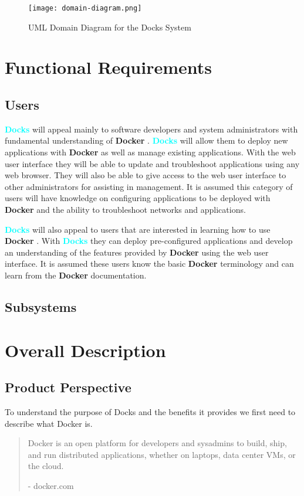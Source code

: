 \documentclass[]{article}
\newcommand{\docks}{\textbf{\textcolor{Cyan}{Docks}} }
\newcommand{\docker}{\textbf{\textcolor{OliveGreen}{Docker}} }
\begin{document}
\begin{figure}[H]
	\centering
	\texttt{[image: domain-diagram.png]}
	\caption{UML Domain Diagram for the Docks System}
\end{figure}

\section{Functional Requirements}

\subsection{Users}
\docks will appeal mainly to software developers and system administrators
with fundamental understanding of \docker. \docks will allow
them to deploy new applications with \docker as well as manage existing 
applications. With the web user interface they will be able to
update and troubleshoot applications using any web browser. They will
also be able to give access to the web user interface to other administrators
for assisting in management. It is assumed this category of users will
have knowledge on configuring applications to be deployed with \docker
and the ability to troubleshoot networks and applications.

\docks will also appeal to users that are interested in learning how
to use \docker. With \docks they can deploy pre-configured applications and
develop an understanding of the features provided by \docker using the 
web user interface. It is assumed these users know the basic \docker
terminology and can learn from the \docker documentation.

\subsection{Subsystems}


\section{Overall Description}
\subsection{Product Perspective}
To understand the purpose of Docks and the benefits it provides we first need to describe what Docker is.

\begin{quotation}
	Docker is an open platform for developers and sysadmins to build, ship, and run distributed applications, whether on laptops, data center VMs, or the cloud.

	- docker.com
\end{quotation}
\end{document}
